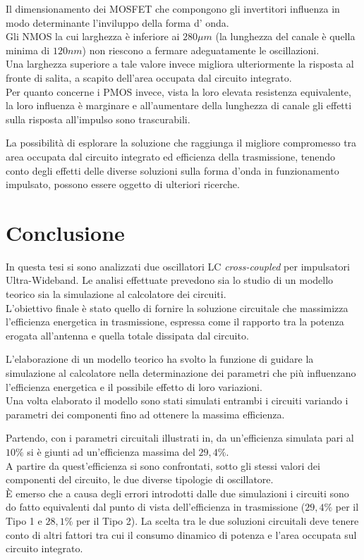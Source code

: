 \documentclass[a4paper, 12pt]{memoir}
\begin{document}
Il dimensionamento dei MOSFET che compongono gli invertitori influenza in modo
determinante l'inviluppo della forma d' onda.\\
Gli NMOS la cui larghezza è inferiore ai $280 \mu m$ (la lunghezza del canale è
quella minima di $120nm$) non riescono a fermare adeguatamente le oscillazioni.
\\Una larghezza superiore a tale valore invece migliora ulteriormente la
risposta al fronte di salita, a scapito dell'area occupata dal circuito
integrato.\\
Per quanto concerne i PMOS invece, vista la loro elevata resistenza
equivalente, la loro influenza è marginare e all'aumentare della lunghezza di
canale gli effetti sulla risposta all'impulso sono trascurabili.

La possibilità di esplorare la soluzione che raggiunga il migliore compromesso
tra area occupata dal circuito integrato ed efficienza della trasmissione,
tenendo conto degli effetti delle diverse soluzioni sulla forma d'onda in
funzionamento impulsato, possono essere oggetto di ulteriori ricerche.

\chapter{Conclusione}
In questa tesi si sono analizzati due oscillatori LC \emph{cross-coupled} per
impulsatori Ultra-Wideband. Le analisi effettuate prevedono sia lo studio di un
modello teorico sia la simulazione al calcolatore dei circuiti.\\
L'obiettivo finale è stato quello di fornire la soluzione circuitale che
massimizza l'efficienza energetica in trasmissione, espressa come il rapporto
tra la potenza erogata all'antenna e quella totale dissipata dal circuito.

L'elaborazione di un modello teorico ha svolto la funzione di guidare la
simulazione al calcolatore nella determinazione dei parametri che più
influenzano l'efficienza energetica e il possibile effetto di loro variazioni.\\
Una volta elaborato il modello sono stati simulati entrambi i circuiti variando
i parametri dei componenti fino ad ottenere la massima efficienza.

Partendo, con i parametri circuitali illustrati in\cite{Neviani14}, da 
un'efficienza simulata pari al $10\%$ si è giunti ad un'efficienza massima del
$29,4\%$.\\
A partire da quest'efficienza si sono confrontati, sotto gli stessi valori dei
componenti del circuito, le due diverse tipologie di oscillatore.\\
\`E emerso che a causa degli errori introdotti dalle due simulazioni i circuiti
sono do fatto equivalenti dal punto di vista dell'efficienza in trasmissione
($29,4\%$ per il Tipo 1 e $28,1\%$ per il Tipo 2). La scelta tra le due
soluzioni circuitali deve tenere conto di altri fattori tra cui il consumo
dinamico di potenza e l'area occupata sul circuito integrato.
\end{document}
